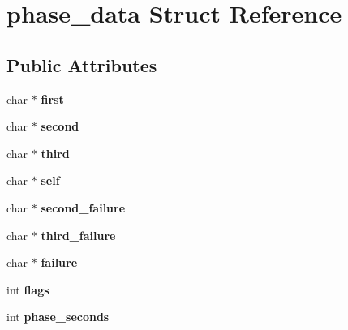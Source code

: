 \hypertarget{structphase__data}{\section{phase\-\_\-data Struct Reference}
\label{structphase__data}
}
\subsection*{Public Attributes}
\begin{DoxyCompactItemize}
\item 
\hypertarget{structphase__data_a42c06b3b9dc664bd812e161183f59da2}{char $\ast$ {\bfseries first}}\label{structphase__data_a42c06b3b9dc664bd812e161183f59da2}

\item 
\hypertarget{structphase__data_a96f7fea73880bf5e02418ab7e7f0ae8b}{char $\ast$ {\bfseries second}}\label{structphase__data_a96f7fea73880bf5e02418ab7e7f0ae8b}

\item 
\hypertarget{structphase__data_a0c04e9a284187a2d4b3efd398123c478}{char $\ast$ {\bfseries third}}\label{structphase__data_a0c04e9a284187a2d4b3efd398123c478}

\item 
\hypertarget{structphase__data_af02ac5eea8ee0e8f3ec18c3013924722}{char $\ast$ {\bfseries self}}\label{structphase__data_af02ac5eea8ee0e8f3ec18c3013924722}

\item 
\hypertarget{structphase__data_a44c725df8c15fc1b52f433a3862e45f5}{char $\ast$ {\bfseries second\-\_\-failure}}\label{structphase__data_a44c725df8c15fc1b52f433a3862e45f5}

\item 
\hypertarget{structphase__data_aa9dc36aa685d7e98fcbc3d66c885dd45}{char $\ast$ {\bfseries third\-\_\-failure}}\label{structphase__data_aa9dc36aa685d7e98fcbc3d66c885dd45}

\item 
\hypertarget{structphase__data_a15eb92a44419b1e2fe576fd27a5ae34a}{char $\ast$ {\bfseries failure}}\label{structphase__data_a15eb92a44419b1e2fe576fd27a5ae34a}

\item 
\hypertarget{structphase__data_a696b0752c0346de04a5665fa77d67977}{int {\bfseries flags}}\label{structphase__data_a696b0752c0346de04a5665fa77d67977}

\item 
\hypertarget{structphase__data_a89b3c562c8cde0e24d724b3590fac504}{int {\bfseries phase\-\_\-seconds}}\label{structphase__data_a89b3c562c8cde0e24d724b3590fac504}


\end{DoxyCompactItemize}
